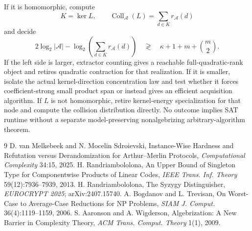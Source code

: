 \documentclass[11pt]{article}
\begin{document}
If it is homomorphic, compute
\[
K=\ker L,
\qquad
\boxed{
\operatorname{Coll}_{\mathcal A}(L)
=
\sum_{d\in K}r_{\mathcal A}(d)
}
\]
and decide
\[
\boxed{
2\log_2|\mathcal A|
-
\log_2\!\left(\sum_{d\in K}r_{\mathcal A}(d)\right)
}
\quad\mathop{\gtrless}\quad
\boxed{
\kappa+1+m+\binom m2
}.
\]
If the left side is larger, extractor counting gives a reachable full-quadratic-rank object and retires quadratic contraction for that realization. If it is smaller, isolate the actual kernel-direction concentration law and test whether it forces coefficient-strong small product span or instead gives an efficient acquisition algorithm. If \(L\) is not homomorphic, retire kernel-energy specialization for that node and compute the collision distribution directly. No outcome implies SAT runtime without a separate model-preserving nonalgebrizing arbitrary-algorithm theorem.

\begin{thebibliography}{9}
 D. van Melkebeek and N. Mocelin Sdroievski, Instance-Wise Hardness and Refutation versus Derandomization for Arthur--Merlin Protocols, \emph{Computational Complexity} 34:15, 2025.
 H. Randriambololona, An Upper Bound of Singleton Type for Componentwise Products of Linear Codes, \emph{IEEE Trans. Inf. Theory} 59(12):7936--7939, 2013.
 H. Randriambololona, The Syzygy Distinguisher, \emph{EUROCRYPT 2025}; arXiv:2407.15740.
 A. Bogdanov and L. Trevisan, On Worst-Case to Average-Case Reductions for NP Problems, \emph{SIAM J. Comput.} 36(4):1119--1159, 2006.
 S. Aaronson and A. Wigderson, Algebrization: A New Barrier in Complexity Theory, \emph{ACM Trans. Comput. Theory} 1(1), 2009.
\end{thebibliography}
\end{document}
